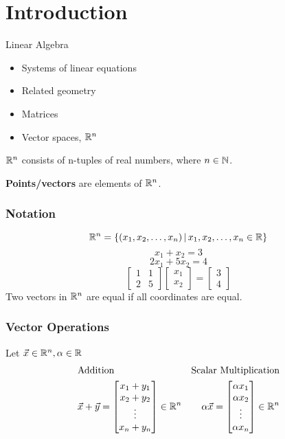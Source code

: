 \documentclass[english, 12pt]{article}
\begin{document}
\notesheader
\section{Introduction}
Linear Algebra 
\begin{itemize}
\item Systems of linear equations
\item Related geometry
\item Matrices
\item Vector spaces, ${\mathbb{R}}^n$
\end{itemize}
${\mathbb{R}}^n$ consists of n-tuples of real numbers, where $n \in {\mathbb{N}}$. 
\begin{defn}
\textbf{Points/vectors} are elements of ${\mathbb{R}}^n$.
\end{defn}
\subsubsection*{Notation}
\[{\mathbb{R}}^n = \{(x_{1},x_{2},\dots,x_{n})\,|\, x_{1},x_{2},\dots,x_{n} \in {\mathbb{R}} \}\]
\[x_{1} + x_{2} = 3\]
\[2 x_{1} + 5 x_{2} = 4\]
\[
\begin{bmatrix}
1 & 1\\
2 & 5
\end{bmatrix}
\begin{bmatrix}
x_{1}\\
x_{2}
\end{bmatrix}
=
\begin{bmatrix}
3\\
4
\end{bmatrix}
\]
Two vectors in ${\mathbb{R}}^n$ are equal if all coordinates are equal.
\subsubsection*{Vector Operations}
Let $\vec{x} \in {\mathbb{R}}^n, \alpha \in {\mathbb{R}}$
\begin{align*}
& \text{Addition} & \text{Scalar Multiplication} \\
& \vec{x} + \vec{y} = 
\begin{bmatrix}
x_{1} + y_{1} \\
x_{2} + y_{2} \\
\vdots \\
x_{n} + y_{n}
\end{bmatrix} \in {\mathbb{R}}^n & 
\alpha \vec{x} = 
\begin{bmatrix}
\alpha x_{1} \\
\alpha x_{2} \\
\vdots \\
\alpha x_{n} 
\end{bmatrix} \in {\mathbb{R}}^n
\end{align*}
\end{document}
